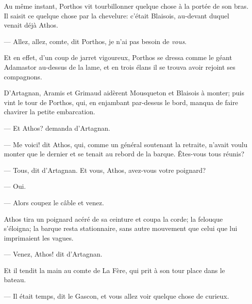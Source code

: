 Au même instant, Porthos vit tourbillonner quelque chose à la portée de son bras. Il saisit ce quelque chose par la chevelure: c'était Blaisois, au-devant duquel venait déjà Athos.

— Allez, allez, comte, dit Porthos, je n'ai pas besoin de \textit{vous}.

Et en effet, d'un coup de jarret vigoureux, Porthos se dressa comme le géant Adamastor au-dessus de la lame, et en trois élans il se trouva avoir rejoint ses compagnons.

D'Artagnan, Aramis et Grimaud aidèrent Mousqueton et Blaisois à monter; puis vint le tour de Porthos, qui, en enjambant par-dessus le bord, manqua de faire chavirer la petite embarcation.

— Et Athos? demanda d'Artagnan.

— Me voici! dit Athos, qui, comme un général soutenant la retraite, n'avait voulu monter que le dernier et se tenait au rebord de la barque. Êtes-vous tous réunis?

— Tous, dit d'Artagnan. Et vous, Athos, avez-vous votre poignard?

— Oui.

— Alors coupez le câble et venez.

Athos tira un poignard acéré de sa ceinture et coupa la corde; la felouque s'éloigna; la barque resta stationnaire, sans autre mouvement que celui que lui imprimaient les vagues.

— Venez, Athos! dit d'Artagnan.

Et il tendit la main au comte de La Fère, qui prit à son tour place dans le bateau.

— Il était temps, dit le Gascon, et vous allez voir quelque chose de curieux.